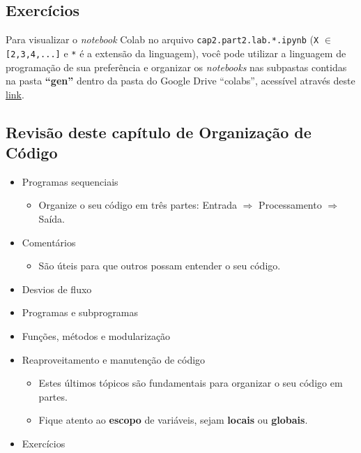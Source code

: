 \documentclass[12pt,a4paper]{article}
\providecommand{\tightlist}{%
      \setlength{\itemsep}{0pt}\setlength{\parskip}{0pt}}
\begin{document}
    \hypertarget{exercuxedcios}{%
\subsection{Exercícios}\label{exercuxedcios}}

    Para visualizar o \emph{notebook} Colab no arquivo
\texttt{cap2.part2.lab.*.ipynb} (\texttt{X} \(\in\)
\texttt{{[}2,3,4,...{]}} e \texttt{*} é a extensão da linguagem), você
pode utilizar a linguagem de programação de sua preferência e organizar
os \emph{notebooks} nas subpastas contidas na pasta \textbf{``gen''}
dentro da pasta do Google Drive ``colabs'', acessível através deste
\href{https://drive.google.com/drive/folders/1YlFwv8XYN7PYYf-HwDMlkxzbmXzJw9cM?usp=sharing}{link}.

    \hypertarget{revisuxe3o-deste-capuxedtulo-de-organizauxe7uxe3o-de-cuxf3digo}{%
\subsection{Revisão deste capítulo de Organização de
Código}\label{revisuxe3o-deste-capuxedtulo-de-organizauxe7uxe3o-de-cuxf3digo}}

\begin{itemize}
\tightlist
\item
  Programas sequenciais

  \begin{itemize}
  \tightlist
  \item
    Organize o seu código em três partes: Entrada \(\Rightarrow\)
    Processamento \(\Rightarrow\) Saída.
  \end{itemize}
\item
  Comentários

  \begin{itemize}
  \tightlist
  \item
    São úteis para que outros possam entender o seu código.
  \end{itemize}
\item
  Desvios de fluxo
\item
  Programas e subprogramas
\item
  Funções, métodos e modularização
\item
  Reaproveitamento e manutenção de código

  \begin{itemize}
  \tightlist
  \item
    Estes últimos tópicos são fundamentais para organizar o seu código
    em partes.
  \item
    Fique atento ao \textbf{escopo} de variáveis, sejam \textbf{locais}
    ou \textbf{globais}.
  \end{itemize}
\item
  Exercícios
\end{itemize}
\end{document}
